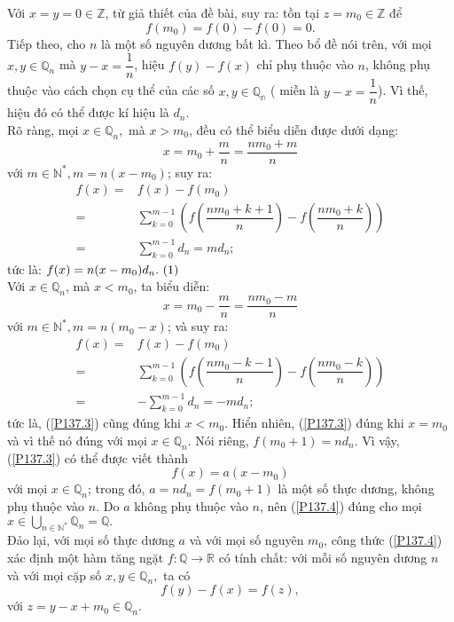 \begin{bt}
{		Với $ x=y=0\in \mathbb{Z} $, từ giả thiết của đề bài, suy ra: tồn tại $ z=m_0\in \mathbb{Z}$ để $$ f(m_0) =f(0)-f(0)=0. $$
		Tiếp theo, cho $ n $ là một số nguyên dương bất kì. Theo bổ đề nói trên, với mọi $ x,y \in \mathbb{Q}_n $ mà $ y-x=\dfrac{1}{n} $, hiệu $ f(y)-f(x) $ chỉ phụ thuộc vào $ n $, không phụ thuộc vào cách chọn cụ thể của các số $ x,y\in \mathbb{Q_n} $ ( miễn là $ y-x =\dfrac{1}{n} $). Vì thế, hiệu đó có thể được kí  hiệu là $ d_n $.\\
		Rõ ràng, mọi $ x \in \mathbb{Q}_n,$ mà $ x>m_0 $, đều có thể biểu diễn được dưới dạng:
		$$ x=m_0+\dfrac{m}{n}=\dfrac{nm_0+m}{n} $$
		với $ m\in \mathbb{N^*}, m=n(x-m_0) $; suy ra: 
		\begin{align*}
		f(x) =&f(x) -f(m_0)\\
		=&\sum\limits_{k=0}^{m-1} \left( f\left(\dfrac{nm_0+k+1}{n}\right)-f\left( \dfrac{nm_0+k}{n}\right)\right )  \\
		=&\sum\limits_{k=0}^{m-1}d_n =md_n;
		\end{align*}
		tức là: $f(x) =n(x-m_0)d_n. ~\refstepcounter{equation}\hfill (\theequation)\label{P137.3}$\\
		Với $ x\in \mathbb{Q}_n $, mà $ x<m_0 $, ta biểu diễn: $$ x=m_0-\dfrac{m}{n}=\dfrac{nm_0-m}{n} $$
		với $ m\in  \mathbb{N}^*, m=n(m_0-x)$; và suy ra:
		\begin{align*}
		f(x) =&f(x) -f(m_0)\\
		=&\sum\limits_{k=0}^{m-1} \left( f\left(\dfrac{nm_0-k-1}{n}\right)-f\left( \dfrac{nm_0-k}{n}\right)\right )  \\
		=&-\sum\limits_{k=0}^{m-1}d_n =-md_n;
		\end{align*}
		tức là, (\ref{P137.3})  cũng đúng khi $ x<m_0 $. Hiển nhiên, (\ref{P137.3}) đúng khi $ x=m_0 $ và vì thế nó đúng với mọi $ x\in \mathbb{Q}_n $. Nói riêng, $ f(m_0+1) =nd_n$. Vì vậy, (\ref{P137.3}) có thể được viết thành 
		\begin{equation}\label{P137.4} f(x) =a(x-m_0) \end{equation}
		với mọi $ x\in \mathbb{Q}_n $; trong đó, $ a =nd_n =f(m_0+1)$ là một số thực dương, không phụ thuộc vào $ n $. Do $ a $ không phụ thuộc vào $ n $, nên (\ref{P137.4}) đúng cho mọi $x\in  \displaystyle\bigcup\limits_{n \in \mathbb{N^*}}\mathbb{Q}_n=\mathbb{Q}.$\\
		Đảo lại, với mọi số thực dương $ a $ và với mọi số nguyên $ m_0 $, công thức (\ref{P137.4}) xác định một hàm tăng ngặt $ f\colon \mathbb{Q} \rightarrow \mathbb{R} $ có tính chất: với mỗi số nguyên dương $ n $ và với mọi cặp số $ x,y \in \mathbb{Q}_n, $ ta có $$ f(y)-f(x) =f(z),$$ với $ z=y-x+m_0 \in \mathbb{Q}_n. $
		
}
\end{bt}
